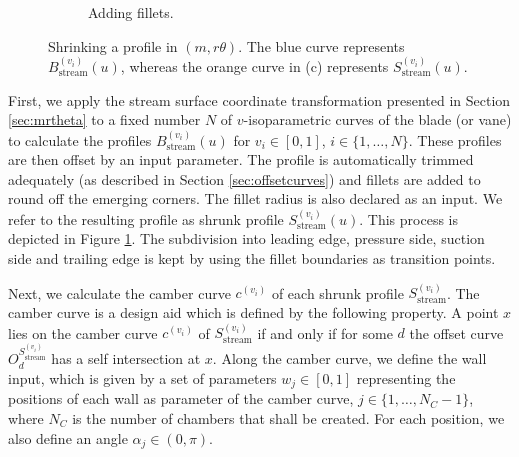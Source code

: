 \documentclass[a4paper, 11pt]{report}
\theoremstyle{definition}
\begin{document}
\begin{figure}[H]
\begin{subfigure}{.32\textwidth}
			\caption{Adding fillets.}
		\end{subfigure}
		\caption{Shrinking a profile in $(m, r\theta)$. The blue curve represents $B^{(v_i)}_\textrm{stream}(u)$, whereas the orange curve in (c) represents $S^{(v_i)}_\textrm{stream}(u)$.}
		\label{fig:profileshrinking}
	\end{figure}

	First, we apply the stream surface coordinate transformation presented in Section \ref{sec:mrtheta} to a fixed number $N$ of $v$-isoparametric curves of the blade (or vane) to calculate the profiles $B^{(v_i)}_\textrm{stream}(u)$ for $v_i \in [0,1]$, $i \in \{1,\ldots,N\}$. These profiles are then offset by an input parameter. The profile is automatically trimmed adequately (as described in Section \ref{sec:offsetcurves}) and fillets are added to round off the emerging corners. The fillet radius is also declared as an input. We refer to the resulting profile as shrunk profile $S^{(v_i)}_\textrm{stream}(u)$. This process is depicted in Figure \ref{fig:profileshrinking}. The subdivision into leading edge, pressure side, suction side and trailing edge is kept by using the fillet boundaries as transition points.

	Next, we calculate the camber curve $c^{(v_i)}$ of each shrunk profile $S^{(v_i)}_\textrm{stream}$. The camber curve is a design aid which is defined by the following property. A point $x$ lies on the camber curve $c^{(v_i)}$ of $S^{(v_i)}_\textrm{stream}$ if and only if for some $d$ the offset curve $O^{S^{(v_i)}_\textrm{stream}}_d$ has a self intersection at $x$. Along the camber curve, we define the wall input, which is given by a set of parameters $w_j \in [0,1]$ representing the positions of each wall as parameter of the camber curve, $j \in \{1,\ldots,N_C-1\}$, where $N_C$ is the number of chambers that shall be created. For each position, we also define an angle $\alpha_j \in (0, \pi)$.
\end{document}
